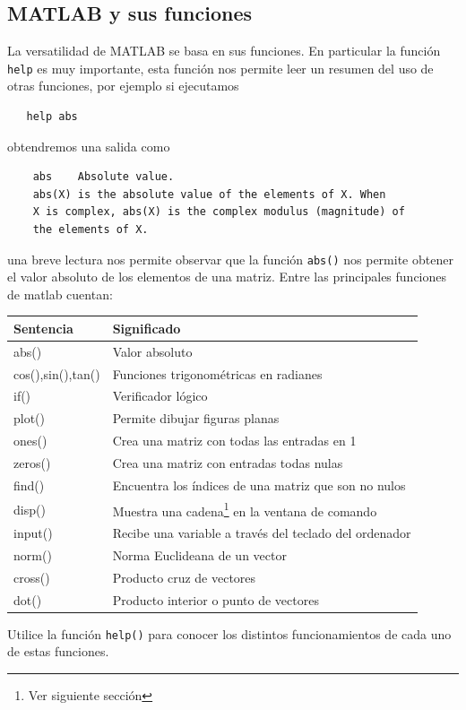 \documentclass[11pt]{article}
\begin{document}
  \subsection{MATLAB y sus funciones}
  La versatilidad de MATLAB se basa en sus funciones. En particular la funci\'on \texttt{help} es muy importante, esta funci\'on nos permite leer un resumen del uso de otras funciones, por ejemplo si ejecutamos 
  \begin{verbatim}
   help abs
  \end{verbatim}
  obtendremos una salida como
  \begin{verbatim}
    abs    Absolute value.
    abs(X) is the absolute value of the elements of X. When
    X is complex, abs(X) is the complex modulus (magnitude) of
    the elements of X.
  \end{verbatim}
  una breve lectura nos permite observar que la funci\'on \texttt{abs()} nos permite obtener el valor absoluto de los elementos de una matriz. Entre las principales funciones de matlab cuentan:
  \begin{center}
      \begin{tabular}{p{5cm}|l}
        \hline
	Sentencia	  & Significado\\
	\hline
       abs()		  & Valor absoluto\\
       cos(),sin(),tan()  & Funciones trigonom\'etricas en radianes\\
       if()		& Verificador l\'ogico\\
       plot()		& Permite dibujar figuras planas\\
       ones()		& Crea una matriz con todas las entradas en 1\\
       zeros()		& Crea una matriz con entradas todas nulas \\
       find()		& Encuentra los \'indices de una matriz que son no nulos\\
       disp()		& Muestra una cadena\footnote{Ver siguiente secci\'on} en la ventana de comando\\
       input()		& Recibe una variable a trav\'es del teclado del ordenador\\
       norm() 		& Norma Euclideana de un vector \\
       cross()		& Producto cruz de vectores \\
       dot()		& Producto interior o punto de vectores
      \end{tabular}
  \end{center}

Utilice la funci\'on \texttt{help()} para conocer los distintos funcionamientos de cada uno de estas funciones.
\end{document}
